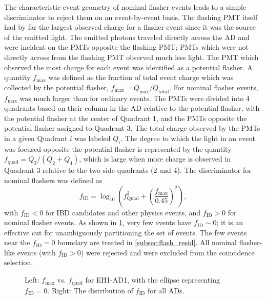 The characteristic event geometry of nominal flasher events
leads to a simple discriminator to reject them on an event-by-event basis.
The flashing PMT itself had by far the largest observed charge
for a flasher event since it was the source of the emitted light.
The emitted photons traveled directly across the AD
and were incident on the PMTs opposite the flashing PMT;
PMTs which were not directly across from the flashing PMT
observed much less light.
The PMT which observed the most charge for each event
was identified as a potential flasher.
A quantity $f_{\text{max}}$ was defined as the fraction of total event charge
which was collected by the potential flasher,
$f_{\text{max}} = Q_{\text{max}}/Q_{\text{total}}$.
For nominal flasher events, $f_{\text{max}}$ was much larger than for ordinary events.
The PMTs were divided into 4 quadrants based on their column in the AD
relative to the potential flasher,
with the potential flasher at the center of Quadrant 1,
and the PMTs opposite the potential flasher assigned to Quadrant 3.
The total charge observed by the PMTs in a given Quadrant $i$
was labeled $Q_i$.
The degree to which the light in an event was focused
opposite the potential flasher
is represented by the quantity $f_{\text{quad}} = Q_3/(Q_2 + Q_4)$,
which is large when more charge is observed in Quadrant 3
relative to the two side quadrants (2 and 4).
The discriminator for nominal flashers was defined as
\begin{equation}
    f_{\text{ID}} = \log_{10}\left(
        f_{\text{Quad}}^2 + \left(
            \frac{f_{\text{max}}}{0.45}
        \right)^2
    \right),
\end{equation}
with $f_{\text{ID}} < 0$ for IBD candidates and other physics events,
and $f_{\text{ID}} > 0$ for nominal flasher events.
As shown in \cref{fig:flasher_nominal_cut},
very few events have $f_{\text{ID}}\sim0$;
it is an effective cut for unambiguously partitioning the set of events.
The few events near the $f_{\text{ID}} = 0$ boundary
are treated in \cref{subsec:flash_resid}.
All nominal flasher-like events (with $f_{\text{ID}} > 0$) were rejected
and were excluded from the coincidence selection.

\begin{figure}
    \caption{
        Left: $f_{\text{max}}$ vs. $f_{\text{quad}}$ for EH1-AD1,
        with the ellipse representing $f_{\text{ID}} = 0$.
        Right: The distribution of $f_{\text{ID}}$ for all ADs.
    }
    \label{fig:flasher_nominal_cut}
\end{figure}

